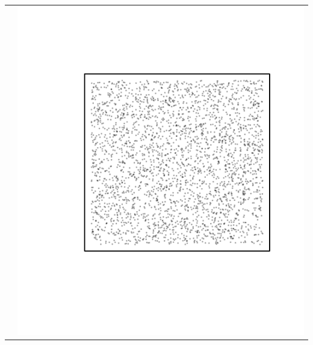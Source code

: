 \documentclass{article}\usepackage{graphicx, color}
\makeatletter
\def\maxwidth{ %
  \ifdim\Gin@nat@width>\linewidth
    \linewidth
  \else
    \Gin@nat@width
  \fi
}
\newenvironment{knitrout}{}{} %
\makeatother
\begin{document}
\begin{tabular}{cc}
&
\begin{knitrout}
\definecolor{shadecolor}{rgb}{0.969, 0.969, 0.969}\color{fgcolor}\includegraphics[width=\maxwidth]{figure/unnamed-chunk-18} 
\end{knitrout}

\\
\end{tabular}
\end{document}
